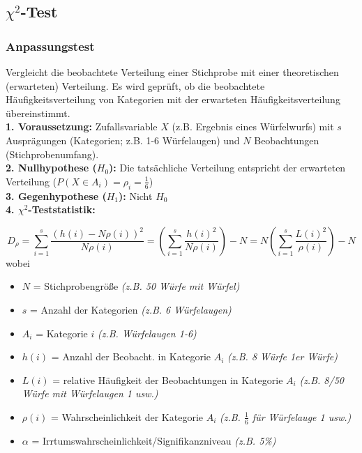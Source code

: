 \subsection{\(\chi^2\)-Test}

\subsubsection{Anpassungstest}

Vergleicht die beobachtete Verteilung einer Stichprobe mit 
einer theoretischen (erwarteten) Verteilung. Es wird geprüft, 
ob die beobachtete Häufigkeitsverteilung von Kategorien mit der 
erwarteten Häufigkeitsverteilung übereinstimmt.\\

\textbf{1. Voraussetzung:} Zufallsvariable \(X\) (z.B. Ergebnis eines Würfelwurfs) mit \(s\) Ausprägungen 
(Kategorien; z.B. 1-6 Würfelaugen) und \(N\) Beobachtungen (Stichprobenumfang).\\

\textbf{2. Nullhypothese (\(H_0\)):} Die tatsächliche Verteilung entspricht der erwarteten Verteilung (\(P(X \in A_i)=\rho_i=\frac{1}{6}\))\\

\textbf{3. Gegenhypothese (\(H_1\)):} Nicht \(H_0\)\\

\textbf{4. \(\chi^2\)-Teststatistik:}

\begin{equation*}
    D_{\rho} = \sum_{i=1}^{s}\frac{(h(i)-N\rho(i))^2}{N\rho(i)}=\left(\sum_{i=1}^{s}\frac{h(i)^2}{N\rho(i)}\right)-N=N\left(\sum_{i=1}^{s}\frac{L(i)^2}{\rho(i)}\right) - N
\end{equation*}
wobei
\begin{itemize}
    \item \(N\) = Stichprobengröße \emph{(z.B. 50 Würfe mit Würfel)}
    \item \(s\) = Anzahl der Kategorien \emph{(z.B. 6 Würfelaugen)}
    \item \(A_i\) = Kategorie \(i\) \emph{(z.B. Würfelaugen 1-6)}
    \item \(h(i)\) = Anzahl der Beobacht. in Kategorie \(A_i\) \emph{(z.B. 8 Würfe 1er Würfe)}
    \item \(L(i)\) = relative Häufigkeit der Beobachtungen in Kategorie \(A_i\) \emph{(z.B. 8/50 Würfe mit Würfelaugen 1 usw.)}
    \item \(\rho(i)\) = Wahrscheinlichkeit der Kategorie \(A_i\) \emph{(z.B. \(\frac{1}{6}\) für Würfelauge 1 usw.)}
    \item \(\alpha\) = Irrtumswahrscheinlichkeit/Signifikanzniveau \emph{(z.B. 5\%)}
\end{itemize}


